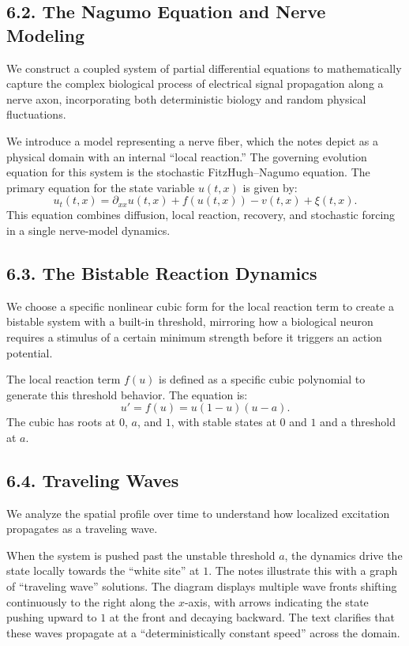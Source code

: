 \documentclass[11pt]{article}
\theoremstyle{definition}
\theoremstyle{remark}
\begin{document}
\subsection*{6.2. The Nagumo Equation and Nerve Modeling}
We construct a coupled system of partial differential equations to mathematically capture the complex biological process of electrical signal propagation along a nerve axon, incorporating both deterministic biology and random physical fluctuations.

We introduce a model representing a nerve fiber, which the notes depict as a physical domain with an internal ``local reaction.'' The governing evolution equation for this system is the stochastic FitzHugh--Nagumo equation. The primary equation for the state variable $u(t,x)$ is given by:
\[
u_t(t,x)=\partial_{xx}u(t,x)+f(u(t,x))-v(t,x)+\xi(t,x).
\]
This equation combines diffusion, local reaction, recovery, and stochastic forcing in a single nerve-model dynamics.


\subsection*{6.3. The Bistable Reaction Dynamics}
We choose a specific nonlinear cubic form for the local reaction term to create a bistable system with a built-in threshold, mirroring how a biological neuron requires a stimulus of a certain minimum strength before it triggers an action potential.

The local reaction term $f(u)$ is defined as a specific cubic polynomial to generate this threshold behavior. The equation is:
\[
u'=f(u)=u(1-u)(u-a).
\]
The cubic has roots at $0$, $a$, and $1$, with stable states at $0$ and $1$ and a threshold at $a$.


\subsection*{6.4. Traveling Waves}
We analyze the spatial profile over time to understand how localized excitation propagates as a traveling wave.

When the system is pushed past the unstable threshold $a$, the dynamics drive the state locally towards the ``white site'' at $1$. The notes illustrate this with a graph of ``traveling wave'' solutions. The diagram displays multiple wave fronts shifting continuously to the right along the $x$-axis, with arrows indicating the state pushing upward to $1$ at the front and decaying backward. The text clarifies that these waves propagate at a ``deterministically constant speed'' across the domain.
\end{document}
